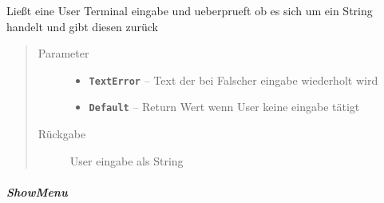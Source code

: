 \documentclass[letterpaper,10pt,ngerman]{sphinxmanual}
\begin{document}
\begin{fulllineitems}
\label{com/linuxluigi/polynomial/TerminalInterface:com.linuxluigi.polynomial.TerminalInterface.InputString(String, String)}
Ließt eine User Terminal eingabe und ueberprueft ob es sich um ein String handelt und gibt diesen zurück
\begin{quote}\begin{description}
\item[{Parameter}] \leavevmode\begin{itemize}
\item {} 
\textbf{\texttt{TextError}} -- Text der bei Falscher eingabe wiederholt wird

\item {} 
\textbf{\texttt{Default}} -- Return Wert wenn User keine eingabe tätigt

\end{itemize}

\item[{Rückgabe}] \leavevmode
User eingabe als String

\end{description}\end{quote}

\end{fulllineitems}



\subparagraph{ShowMenu}
\label{com/linuxluigi/polynomial/TerminalInterface:showmenu}
\end{document}
